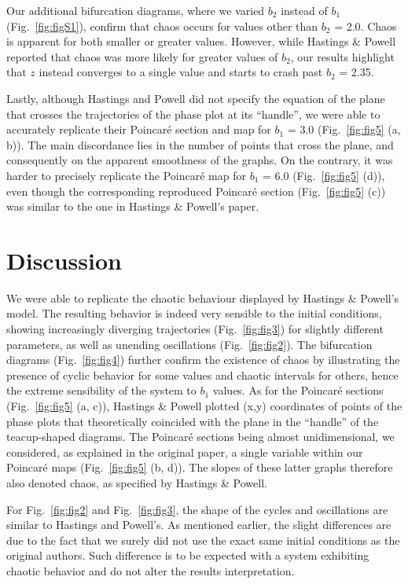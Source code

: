 \documentclass[
]{article}
\begin{document}
Our additional bifurcation diagrams, where we varied \(b_2\) instead of
\(b_1\) (Fig.~\ref{fig:figS1}), confirm that chaos occurs for values
other than \(b_2\) = 2.0. Chaos is apparent for both smaller or greater
values. However, while Hastings \& Powell reported that chaos was more
likely for greater values of \(b_2\), our results highlight that \(z\)
instead converges to a single value and starts to crash past \(b_2\) =
2.35.

Lastly, although Hastings and Powell did not specify the equation of the
plane that crosses the trajectories of the phase plot at its ``handle'',
we were able to accurately replicate their Poincaré section and map for
\(b_1\) = 3.0 (Fig.~\ref{fig:fig5} (a, b)). The main discordance lies in
the number of points that cross the plane, and consequently on the
apparent smoothness of the graphs. On the contrary, it was harder to
precisely replicate the Poincaré map for \(b_1\) = 6.0
(Fig.~\ref{fig:fig5} (d)), even though the corresponding reproduced
Poincaré section (Fig.~\ref{fig:fig5} (c)) was similar to the one in
Hastings \& Powell's paper.

\hypertarget{discussion}{%
\section{Discussion}\label{discussion}}

We were able to replicate the chaotic behaviour displayed by Hastings \&
Powell's model. The resulting behavior is indeed very sensible to the
initial conditions, showing increasingly diverging trajectories
(Fig.~\ref{fig:fig3}) for slightly different parameters, as well as
unending oscillations (Fig.~\ref{fig:fig2}). The bifurcation diagrams
(Fig.~\ref{fig:fig4}) further confirm the existence of chaos by
illustrating the presence of cyclic behavior for some values and chaotic
intervals for others, hence the extreme sensibility of the system to
\(b_1\) values. As for the Poincaré sections (Fig.~\ref{fig:fig5} (a,
c)), Hastings \& Powell plotted (x,y) coordinates of points of the phase
plots that theoretically coincided with the plane in the ``handle'' of
the teacup-shaped diagrams. The Poincaré sections being almost
unidimensional, we considered, as explained in the original paper, a
single variable within our Poincaré maps (Fig.~\ref{fig:fig5} (b, d)).
The slopes of these latter graphs therefore also denoted chaos, as
specified by Hastings \& Powell.

For Fig.~\ref{fig:fig2} and Fig.~\ref{fig:fig3}, the shape of the cycles
and oscillations are similar to Hastings and Powell's. As mentioned
earlier, the slight differences are due to the fact that we surely did
not use the exact same initial conditions as the original authors. Such
difference is to be expected with a system exhibiting chaotic behavior
and do not alter the results interpretation.
\end{document}

